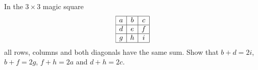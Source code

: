 In the $3\times3$ magic square
\[
\begin{array}{|c|c|c|}\hline a&b&c\\\hline d&e&f\\\hline g&h&i\\\hline\end{array}
\]
all rows, columns and both diagonals have the same sum. Show that $b+d=2i$, $b+f=2g$, $f+h=2a$ and $d+h=2c$.
